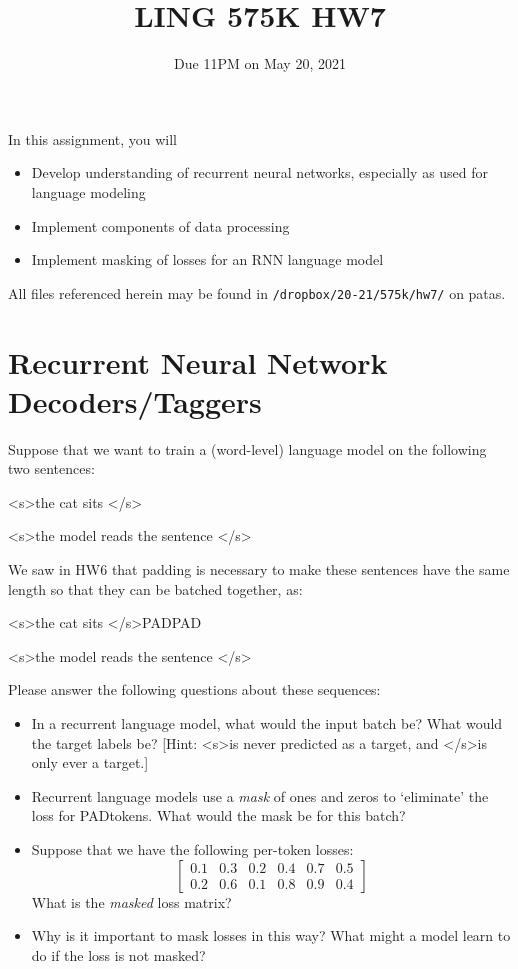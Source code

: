 \documentclass[11pt]{article}
\newcommand{\bos}{\textless s\textgreater\:}
\newcommand{\eos}{\textless /s\textgreater\:}
\newcommand{\pad}{PAD\:}
\begin{document}
\title{LING 575K HW7}
\date{\vspace{-0.2in}Due 11PM on May 20, 2021}
\maketitle


\noindent In this assignment, you will 
\begin{itemize}
  \item Develop understanding of recurrent neural networks, especially as used for language modeling
  \item Implement components of data processing 
  \item Implement masking of losses for an RNN language model
\end{itemize}
All files referenced herein may be found in \texttt{/dropbox/20-21/575k/hw7/} on patas.


\section{Recurrent Neural Network Decoders/Taggers}

  Suppose that we want to train a (word-level) language model on the following two sentences:
\begin{center}
  \bos the cat sits \eos

  \bos the model reads the sentence \eos
\end{center}
We saw in HW6 that padding is necessary to make these sentences have the same length so that they can be batched together, as:
\begin{center}
  \bos the cat sits \eos \pad \pad

  \bos the model reads the sentence \eos
\end{center}
Please answer the following questions about these sequences:
\begin{itemize}
  \item In a recurrent language model, what would the input batch be?  What would the target labels be? [Hint: \bos is never predicted as a target, and \eos is only ever a target.]
  \item Recurrent language models use a \emph{mask} of ones and zeros to `eliminate' the loss for \pad tokens.  What would the mask be for this batch?
  \item Suppose that we have the following per-token losses:
    \[ \begin{bmatrix} 0.1 & 0.3 & 0.2 & 0.4 & 0.7 & 0.5 \\ 0.2 & 0.6 & 0.1 & 0.8 & 0.9 & 0.4 \end{bmatrix} \]
    What is the \emph{masked} loss matrix?
  \item Why is it important to mask losses in this way?  What might a model learn to do if the loss is not masked?
\end{itemize}
\end{document}
